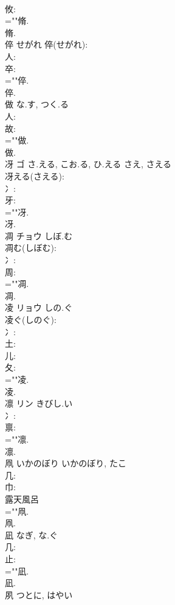 \documentclass[8pt]{extreport}
\begin{document}
\begin{CJK}{UTF8}{min}
\\	攸: 
\\	=""脩.
\\	脩.
\\	倅		せがれ			倅(せがれ): 
\\	人: 
\\	卒: 
\\	=""倅.
\\	倅.
\\	做		な.す, つく.る				
\\	人: 
\\	故: 
\\	=""做.
\\	做.
\\	冴	ゴ	さ.える, こお.る, ひ.える	さえ, さえる	
\\	冴える(さえる): 
\\	冫: 
\\	牙: 
\\	=""冴.
\\	冴.
\\	凋	チョウ	しぼ.む		
\\	凋む(しぼむ): 
\\	冫: 
\\	周: 
\\	=""凋.
\\	凋.
\\	凌	リョウ	しの.ぐ		
\\	凌ぐ(しのぐ): 
\\	冫: 
\\	土: 
\\	儿: 
\\	夂: 
\\	=""凌.
\\	凌.
\\	凛	リン	きびし.い		
\\	冫: 
\\	禀: 
\\	=""凛.
\\	凛.
\\	凧	いかのぼり	いかのぼり, たこ		
\\	几: 
\\	巾: 
\\	露天風呂 
\\	=""凧.
\\	凧.
\\	凪		なぎ, な.ぐ				
\\	几: 
\\	止: 
\\	=""凪.
\\	凪.
\\	夙		つとに, はやい				

\end{CJK}
\end{document}
